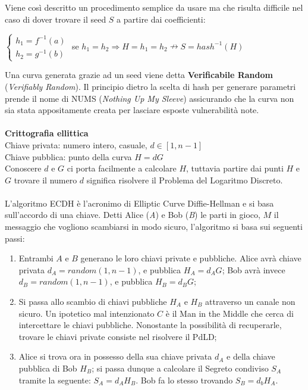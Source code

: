 \documentclass[a4paper,12pt]{tesiinfo}
\begin{document}
Viene cos\`i descritto un procedimento semplice da usare ma che risulta difficile nel caso di dover trovare il seed $S$ a partire dai coefficienti:
\begin{center}
$
\begin{cases}
    h_1 = f^{-1} (a)\\
    h_2 = g^{-1} (b)
\end{cases}$ se 
$h_1 = h_2 \Rightarrow H=h_1=h_2 \nrightarrow S=hash^{-1} (H)$
\end{center}
Una curva generata grazie ad un seed viene detta \textbf{Verificabile Random} (\textit{Verifiably Random}). Il principio dietro la scelta di hash per generare parametri prende il nome di NUMS (\textit{Nothing Up My Sleeve}) assicurando che la curva non sia stata appositamente creata per lasciare esposte vulnerabilit\`a note.
\\
\\
\textbf{Crittografia ellittica}
\\
Chiave privata: numero intero, casuale, $d \in [1, n-1]$\\
Chiave pubblica: punto della curva $H = dG$\\
Conoscere $d$ e $G$ ci porta facilmente a calcolare $H$, tuttavia partire dai punti $H$ e $G$ trovare il numero $d$ significa risolvere il Problema del Logaritmo Discreto.
\\
\\
L'algoritmo ECDH \`e l'acronimo di Elliptic Curve Diffie-Hellman e si basa sull'accordo di una chiave. Detti Alice (\textit{A}) e Bob (\textit{B}) le parti in gioco, $M$ il messaggio che vogliono scambiarsi in modo sicuro, l'algoritmo si basa sui seguenti passi:
\begin{enumerate}
    \item Entrambi $A$ e $B$ generano le loro chiavi private e pubbliche. Alice avr\`a chiave privata $d_A = random(1, n-1)$, e pubblica $H_A = d_AG$; Bob avr\`a invece $d_B = random(1, n-1)$, e pubblica $H_B = d_BG$;
    
    \item Si passa allo scambio di chiavi pubbliche $H_A$ e $H_B$ attraverso un canale non sicuro. Un ipotetico mal intenzionato $C$ \`e il Man in the Middle che cerca di intercettare le chiavi pubbliche. Nonostante la possibilit\`a di recuperarle, trovare le chiavi private consiste nel risolvere il PdLD;
    
    \item Alice si trova ora in possesso della sua chiave privata $d_A$ e della chiave pubblica di Bob $H_B$; si passa dunque a calcolare il Segreto condiviso $S_A$ tramite la seguente: $S_A = d_AH_B$. Bob fa lo stesso trovando $S_B = d_bH_A$.
\end{enumerate}
\end{document}
